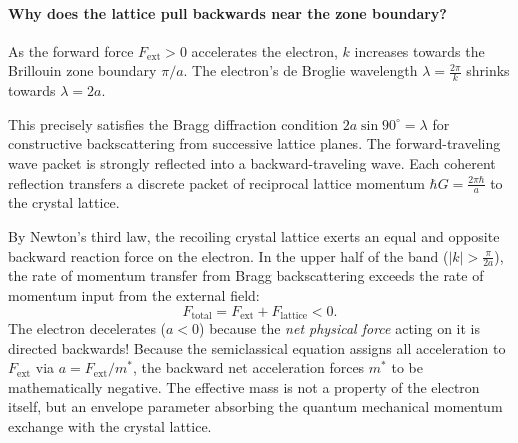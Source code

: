 \documentclass[11pt,a4paper]{article}
\newcommand{\abs}[1]{\left|#1\right|}
\newcommand{\hb}{\hbar}
\begin{document}
\paragraph{Why does the lattice pull backwards near the zone boundary?}
As the forward force $F_{\mathrm{ext}} > 0$ accelerates the electron, $k$ increases towards the Brillouin zone boundary $\pi/a$. The electron's de Broglie wavelength $\lambda = \frac{2\pi}{k}$ shrinks towards $\lambda = 2a$. 

This precisely satisfies the Bragg diffraction condition $2a\sin 90^\circ = \lambda$ for constructive backscattering from successive lattice planes. The forward-traveling wave packet is strongly reflected into a backward-traveling wave. Each coherent reflection transfers a discrete packet of reciprocal lattice momentum $\hb G = \frac{2\pi\hb}{a}$ to the crystal lattice. 

By Newton's third law, the recoiling crystal lattice exerts an equal and opposite backward reaction force on the electron. In the upper half of the band ($\abs{k} > \frac{\pi}{2a}$), the rate of momentum transfer from Bragg backscattering exceeds the rate of momentum input from the external field:
\begin{equation}
    F_{\mathrm{total}} = F_{\mathrm{ext}} + F_{\mathrm{lattice}} < 0.
\end{equation}
The electron decelerates ($a < 0$) because the \emph{net physical force} acting on it is directed backwards! Because the semiclassical equation assigns all acceleration to $F_{\mathrm{ext}}$ via $a = F_{\mathrm{ext}}/m^*$, the backward net acceleration forces $m^*$ to be mathematically negative. The effective mass is not a property of the electron itself, but an envelope parameter absorbing the quantum mechanical momentum exchange with the crystal lattice.
\end{document}
